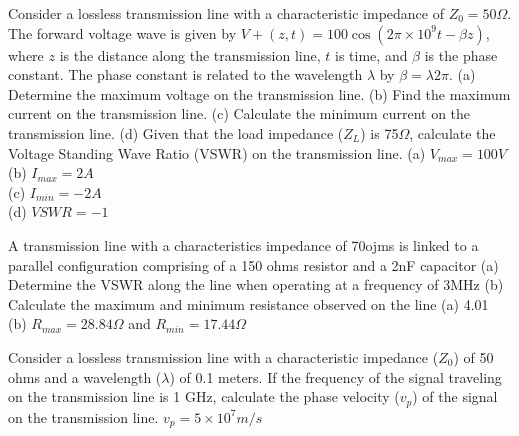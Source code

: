 \begin{mdframed}[backgroundcolor=lightblue, linewidth=1pt, hidealllines=true]
\begin{ExerciseList}
\Exercise[label={ex47}]
Consider a lossless transmission line with a characteristic impedance of $Z_0=50\Omega$. The forward voltage wave is given by $V+(z,t)=100\cos(2\pi\times10^9t-\beta z)$, where $z$ is the distance along the transmission line, $t$ is time, and $\beta$ is the phase constant. The phase constant is related to the wavelength $\lambda$ by $\beta=\lambda2\pi$.
(a)	Determine the maximum voltage on the transmission line.
(b)	Find the maximum current on the transmission line.
(c)	Calculate the minimum current  on the transmission line.
(d)	Given that the load impedance ($Z_L$) is 75$\Omega$, calculate the Voltage Standing Wave Ratio (VSWR) on the transmission line.
\Answer[ref={ex47}]
(a) $V_{max} = 100V$ \\
(b) $I_{max} = 2A$ \\
(c) $I_{min} = -2A$ \\
(d) $VSWR = -1$

\Exercise[label={ex48}]
A transmission line with a characteristics impedance of 70ojms is linked to a parallel configuration comprising of a 150 ohms resistor and a 2nF capacitor
(a)	Determine the VSWR along the line when operating at a frequency of 3MHz
(b)	Calculate the maximum and minimum resistance observed on the line
\Answer[ref={ex48}]
(a)	4.01 \\
(b)	$R_{max} = 28.84\Omega$ and $R_{min} = 17.44\Omega$

\Exercise[label={ex49}]
Consider a lossless transmission line with a characteristic impedance ($Z_0$) of 50 ohms and a wavelength ($\lambda$) of 0.1 meters. If the frequency of the signal traveling on the transmission line is 1 GHz, calculate the phase velocity ($v_p$) of the signal on the transmission line.
\Answer[ref={ex49}]
$v_p=5\times10^7m/s$
\end{ExerciseList}
\end{mdframed}